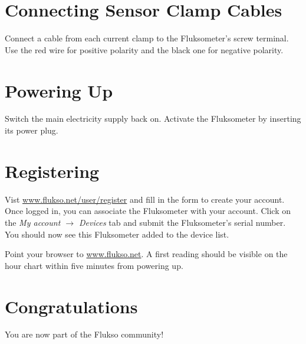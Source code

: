 \section{Connecting Sensor Clamp Cables}

Connect a cable from each current clamp to the Fluksometer's screw terminal. Use the red wire for positive polarity and the black one for negative polarity. 

\section{Powering Up}

Switch the main electricity supply back on. Activate the Fluksometer by inserting its power plug.

\section{Registering}

Vist \href{http://www.flukso.net/user/register}{www.flukso.net/user/register} and fill in the form to create your account. Once logged in, you can associate the Fluksometer with your account. Click on the \emph{My account $\rightarrow$ Devices} tab and submit the Fluksometer's serial number. You should now see this Fluksometer added to the device list.

Point your browser to \href{http://www.flukso.net}{www.flukso.net}. A first reading should be visible on the hour chart within five minutes from powering up.


\section{Congratulations}

You are now part of the Flukso community!
